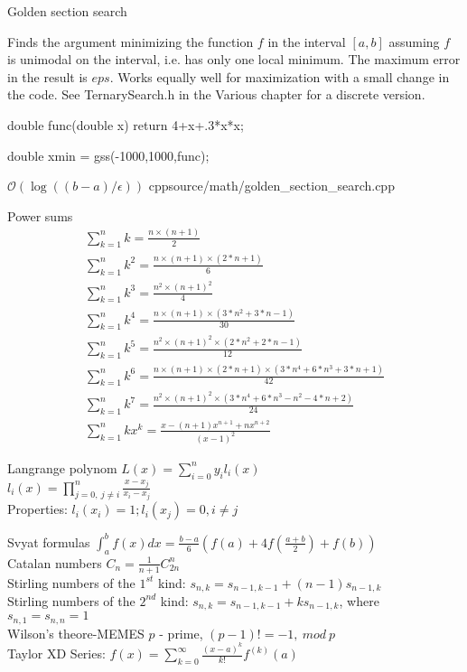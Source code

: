 \documentclass[landscape, 10pt, a4paper, oneside, twocolumn]{extarticle}
\begin{document}
\Algorithm
{Golden section search}
{Finds the argument minimizing the function $f$ in the interval $[a,b]$ assuming $f$ is unimodal on the interval, i.e. has only one local minimum. The maximum error in the result is $eps$. Works equally well for maximization with a small change in the code. See TernarySearch.h in the Various chapter for a discrete version.

double func(double x) { return 4+x+.3*x*x; }

double xmin = gss(-1000,1000,func);}
{$\mathcal{O}(\log((b-a) / \epsilon))$}
{cpp}{source/math/golden_section_search.cpp}

\Formula
{Power sums}
{
    \begin{gather}
        \sum_{k=1}^{n} k = \frac{n \times (n + 1)}{2} \\
        \sum_{k=1}^{n} k^{2} = \frac{n \times (n + 1) \times (2 * n + 1)}{6} \\
        \sum_{k=1}^{n} k^{3} = \frac{n^{2} \times (n + 1)^2}{4} \\
        \sum_{k=1}^{n} k^{4} = \frac{n \times (n + 1) \times (3 * n^{2} + 3 * n - 1)}{30} \\
        \sum_{k=1}^{n} k^{5} = \frac{n^{2} \times (n + 1)^{2} \times (2 * n^{2} + 2 * n - 1)}{12} \\
        \sum_{k=1}^{n} k^{6} = \frac{n \times (n + 1) \times (2 * n + 1) \times (3 * n^{4} + 6 * n^{3} + 3 * n + 1)}{42} \\
        \sum_{k=1}^{n} k^{7} = \frac{n^{2} \times (n + 1)^{2} \times (3 * n^{4} + 6 * n^{3} - n^{2} - 4 * n + 2)}{24} \\
        \sum_{k=1}^{n} k x^{k} = \frac{x - (n + 1) x^{n + 1} + n x^{n + 2}}{(x - 1)^{2}}
    \end{gather}
}

\Formula
{Langrange polynom}
{
    $L(x) = \sum_{i=0}^{n} y_{i} l_{i} (x)$ \\
    $l_{i} (x) = \prod_{j=0,\ j \neq i}^{n} \frac{x - x_{j}}{x_{i} - x_{j}}$ \\
    Properties: $l_{i} (x_{i}) = 1; l_{i} (x_{j}) = 0, i \neq j$
}

\Formula
{Svyat formulas}
{
    $\int_{a}^{b} f(x) dx = \frac{b - a}{6} (f(a) + 4 f(\frac{a + b}{2}) + f(b)) $ \\
    Catalan numbers $C_{n} = \frac{1}{n+1} C_{2n}^{n} $ \\
    Stirling numbers of the $1^{st}$ kind: $s_{n, k} = s_{n - 1, k - 1} + (n - 1) s_{n - 1, k}$ \\
    Stirling numbers of the $2^{nd}$ kind: $s_{n, k} = s_{n - 1, k - 1} + k s_{n - 1, k}$, where $s_{n, 1} = s_{n, n} = 1$ \\
    Wilson's theore-MEMES $p$ - prime, $(p - 1)! = - 1,\ mod\ p$ \\
    Taylor XD Series: $f(x) = \sum_{k=0}^{\infty} \frac{(x - a)^{k}}{k!} f^{(k)}(a)$ 
}
\end{document}
